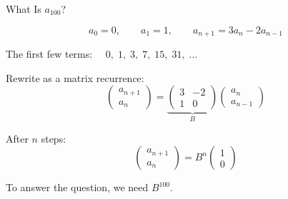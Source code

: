 \documentclass[10pt]{beamer}
\theoremstyle{definition}
\begin{document}
\begin{frame}{What Is $a_{100}$?}

$$a_0 = 0, \qquad a_1 = 1, \qquad a_{n+1} = 3a_n - 2a_{n-1}$$

\vfill\pause

The first few terms: $\quad 0, \; 1, \; 3, \; 7, \; 15, \; 31, \; \ldots$

\vfill\pause

Rewrite as a matrix recurrence:
$$\begin{pmatrix}a_{n+1}\\a_n\end{pmatrix} = \underbrace{\begin{pmatrix}3&-2\\1&0\end{pmatrix}}_{B}\begin{pmatrix}a_n\\a_{n-1}\end{pmatrix}$$

\vfill

After $n$ steps:
$$\begin{pmatrix}a_{n+1}\\a_n\end{pmatrix} = B^n\begin{pmatrix}1\\0\end{pmatrix}$$

\vfill

To answer the question, we need $B^{100}$.

\end{frame}
\end{document}
